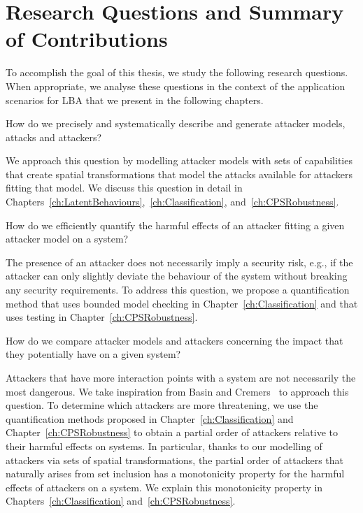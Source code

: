 \section{Research Questions and Summary of Contributions}
\label{sec:Introduction:ResearchQuestions}
To accomplish the goal of this thesis, we study the following research questions. When appropriate, we analyse these questions in the context of the application scenarios for LBA that we present in the following chapters. 
\begin{question}
\label{que:AttackerModel}
How do we precisely and systematically describe and generate attacker models, attacks and attackers?
\end{question}
We approach this question by modelling attacker models with sets of capabilities that create spatial transformations that model the attacks available for attackers fitting that model. We discuss this question in detail in Chapters~\ref{ch:LatentBehaviours},~\ref{ch:Classification}, and~\ref{ch:CPSRobustness}.
\begin{question} 
\label{que:Quantification}
How do we efficiently quantify the harmful effects of an attacker fitting a given attacker model on a system? 
\end{question}
The presence of an attacker does not necessarily imply a security risk, e.g., if the attacker can only slightly deviate the behaviour of the system without breaking any security requirements. To address this question, we propose a quantification method that uses bounded model checking in Chapter~\ref{ch:Classification} and that uses testing in Chapter~\ref{ch:CPSRobustness}. %

\begin{question}
\label{que:Classification}
How do we compare attacker models and attackers concerning the impact that they potentially have on a given system?
\end{question}
Attackers that have more interaction points with a system are not necessarily the most dangerous. We take inspiration from Basin and Cremers~\cite{KnowYourEnemy} to approach this question. To determine which attackers are more threatening, we use the quantification methods proposed in Chapter~\ref{ch:Classification} and Chapter~\ref{ch:CPSRobustness} to obtain a partial order of attackers relative to their harmful effects on systems. In particular, thanks to our modelling of attackers via sets of spatial transformations, the partial order of attackers that naturally arises from set inclusion has a monotonicity property for the harmful effects of attackers on a system. We explain this monotonicity property in Chapters~\ref{ch:Classification} and~\ref{ch:CPSRobustness}.

